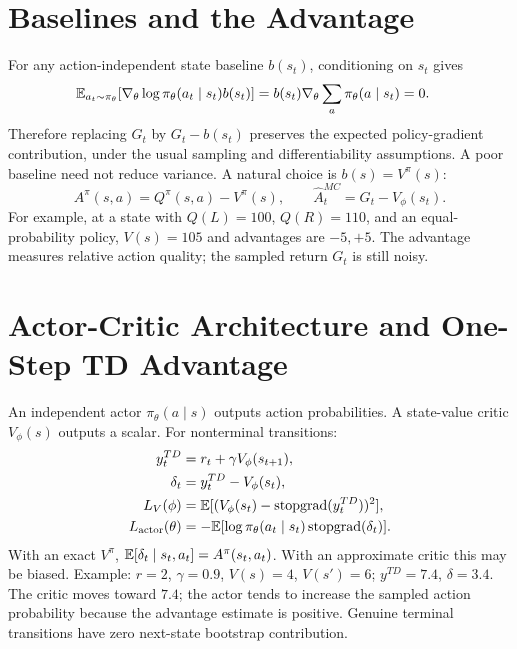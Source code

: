\section{Baselines and the Advantage}
For any action-independent state baseline $b(s_t)$, conditioning on $s_t$ gives
\begin{align}
\mathbb{E}_{a_t\sim\pi_\theta}[
\nabla_\theta\log\pi_\theta(a_t\mid s_t)b(s_t)]
&=b(s_t)\nabla_\theta\sum_a\pi_\theta(a\mid s_t)=0.
\end{align}
Therefore replacing $G_t$ by $G_t-b(s_t)$ preserves the expected policy-gradient contribution, under the usual sampling and differentiability assumptions. A poor baseline need not reduce variance. A natural choice is $b(s)=V^\pi(s)$:
\begin{equation}
A^\pi(s,a)=Q^\pi(s,a)-V^\pi(s),\qquad
\hat A_t^{MC}=G_t-V_\phi(s_t).
\end{equation}
For example, at a state with $Q(L)=100$, $Q(R)=110$, and an equal-probability policy, $V(s)=105$ and advantages are $-5,+5$. The advantage measures relative action quality; the sampled return $G_t$ is still noisy.

\section{Actor-Critic Architecture and One-Step TD Advantage}
An independent actor $\pi_\theta(a\mid s)$ outputs action probabilities. A state-value critic $V_\phi(s)$ outputs a scalar. For nonterminal transitions:
\begin{align}
y_t^{TD}&=r_t+\gamma V_\phi(s_{t+1}),\\
\delta_t&=y_t^{TD}-V_\phi(s_t),\\
L_V(\phi)&=\mathbb{E}[(V_\phi(s_t)-\operatorname{stopgrad}(y_t^{TD}))^2],\\
L_{\mathrm{actor}}(\theta)&=-\mathbb{E}[
\log\pi_\theta(a_t\mid s_t)\operatorname{stopgrad}(\delta_t)].
\end{align}
With an exact $V^\pi$,
$\mathbb{E}[\delta_t\mid s_t,a_t]=A^\pi(s_t,a_t)$.
With an approximate critic this may be biased. Example: $r=2$, $\gamma=0.9$, $V(s)=4$, $V(s')=6$; $y^{TD}=7.4$, $\delta=3.4$. The critic moves toward $7.4$; the actor tends to increase the sampled action probability because the advantage estimate is positive. Genuine terminal transitions have zero next-state bootstrap contribution.

